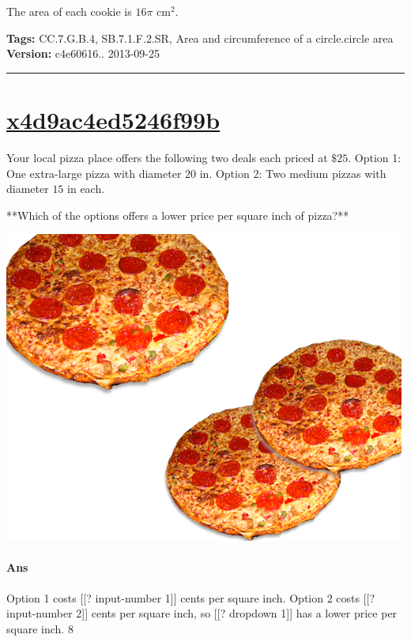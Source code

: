 \documentclass[twocolumn,10pt]{article}
\def\shrinkfactor{0.55}
\begin{document}
The area of each cookie is  $16 \pi \text{ cm}^2$.



\medskip
\noindent
\textbf{Tags:} {\footnotesize CC.7.G.B.4, SB.7.1.F.2.SR, Area and circumference of a circle.circle area}\\
\textbf{Version:} c4e60616.. 2013-09-25
\smallskip\hrule





\section{\href{https://www.khanacademy.org/devadmin/content/items/x4d9ac4ed5246f99b}{x4d9ac4ed5246f99b}}

\noindent
Your local pizza place offers the following two deals each priced at $\$25$.  
Option 1: One extra-large pizza with diameter $20\text{ in}$.  
Option 2: Two medium pizzas with diameter $15\text{ in}$ each.

**Which of the options offers a lower price per square inch of pizza?**


\includegraphics[scale=\shrinkfactor]{figures/5ac1d9f5c91daf1f9f7c2bcb006c279c70abc72a.png}

\paragraph{Ans} Option 1 costs [[? input-number 1]] cents per square inch.  
Option 2 costs [[? input-number 2]] cents per square inch, 
so [[? dropdown 1]] has a lower price per square inch.  8
\end{document}
